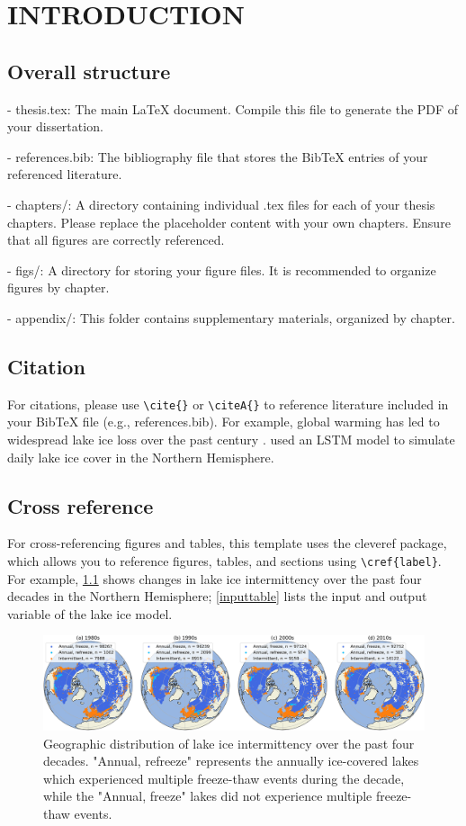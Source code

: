 \chapter{INTRODUCTION}

\section{Overall structure}

- thesis.tex: The main LaTeX document. Compile this file to generate the PDF of your dissertation.

- references.bib: The bibliography file that stores the BibTeX entries of your referenced literature.

- chapters/: A directory containing individual .tex files for each of your thesis chapters. Please replace the placeholder content with your own chapters. Ensure that all figures are correctly referenced.

- figs/: A directory for storing your figure files. It is recommended to organize figures by chapter.

- appendix/: This folder contains supplementary materials, organized by chapter.

\section{Citation}

For citations, please use \verb|\cite{}| or \verb|\citeA{}| to reference literature included in your BibTeX file (e.g., references.bib). For example, global warming has led to widespread lake ice loss over the past century \cite{Huang2022Oct, Sharma2019Mar}.  used an LSTM model to simulate daily lake ice cover in the Northern Hemisphere.

\section{Cross reference}

For cross-referencing figures and tables, this template uses the cleveref package, which allows you to reference figures, tables, and sections using \verb|\cref{label}|. For example, \cref{iceloss} shows changes in lake ice intermittency over the past four decades in the Northern Hemisphere; \cref{inputtable} lists the input and output variable of the lake ice model.

\begin{figure}[ht]
\centering
\includegraphics[width=\textwidth]{figs/ch1/iceloss.jpg}
\caption{Geographic distribution of lake ice intermittency over the past four decades. "Annual, refreeze" represents the annually ice-covered lakes which experienced multiple freeze-thaw events during the decade, while the "Annual, freeze" lakes did not experience multiple freeze-thaw events.}
\label{iceloss}
\end{figure}

